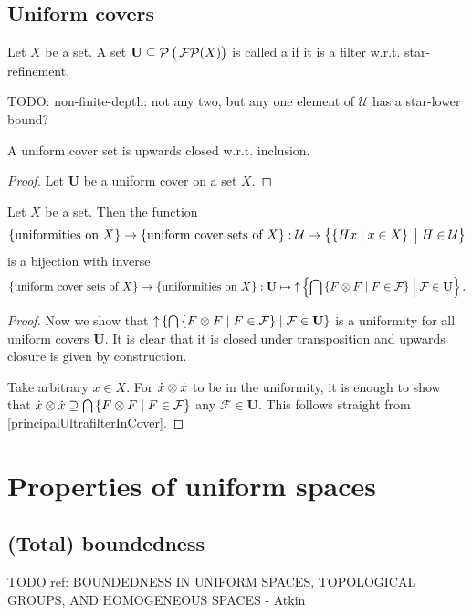 \subsection{Uniform covers}
\begin{definition}
Let $X$ be a set. A set $\mathbf{U}\subseteq \operatorname{\mathcal{P}}\big(\operatorname{\mathcal{FP}}(X)\big)$ is called a  if it is a filter w.r.t. star-refinement.
\end{definition}

TODO: non-finite-depth: not any two, but any one element of $\mathcal{U}$ has a star-lower bound?

\begin{lemma}
A uniform cover set is upwards closed w.r.t. inclusion.
\end{lemma}
\begin{proof}
Let $\mathbf{U}$ be a uniform cover on a set $X$. 
\end{proof}

\begin{proposition}
Let $X$ be a set. Then the function
\[ \{\text{uniformities on $X$}\} \to \{\text{uniform cover sets of $X$}\}: \mathcal{U} \mapsto \left\{ \left\{ Hx \;\middle|\; x\in X \right\}\big. \;\middle|\; H\in \mathcal{U} \right\} \]
is a bijection with inverse
\[ \{\text{uniform cover sets of $X$}\} \to \{\text{uniformities on $X$}\}: \mathbf{U} \mapsto \operatorname{\uparrow}\left\{ \bigcap \left\{ F \otimes F \;\middle|\; F\in \mathcal{F} \right\} \;\middle|\; \mathcal{F}\in \mathbf{U} \right\}. \]
\end{proposition}
\begin{proof}


Now we show that $\operatorname{\uparrow}\left\{ \bigcap \left\{ F \otimes F \;\middle|\; F\in \mathcal{F} \right\} \;\middle|\; \mathcal{F}\in \mathbf{U} \right\}$ is a uniformity for all uniform covers $\mathbf{U}$. It is clear that it is closed under transposition and upwards closure is given by construction.

Take arbitrary $x\in X$. For $\dot{x}\otimes\dot{x}$ to be in the uniformity, it is enough to show that $\dot{x}\otimes\dot{x} \supseteq \bigcap\left\{ F\otimes F \;\middle|\; F\in\mathcal{F} \right\}$ any $\mathcal{F}\in\mathbf{U}$. This follows straight from \ref{principalUltrafilterInCover}.
\end{proof}


\section{Properties of uniform spaces}
\subsection{(Total) boundedness}
TODO ref: BOUNDEDNESS IN UNIFORM SPACES, TOPOLOGICAL GROUPS, AND HOMOGENEOUS SPACES - Atkin

